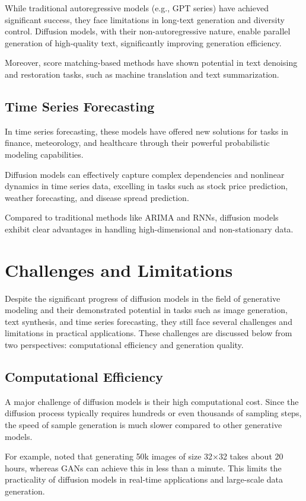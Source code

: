 \documentclass[sigconf,natbib=false]{acmart}
\begin{document}
While traditional autoregressive models (e.g., GPT series) have achieved significant success,
they face limitations in long-text generation and diversity control.
Diffusion models, with their non-autoregressive nature,
enable parallel generation of high-quality text, significantly improving generation efficiency.

Moreover, score matching-based methods have shown potential in text denoising and restoration tasks,
such as machine translation and text summarization.

\subsection{Time Series Forecasting}
In time series forecasting, these models have offered new solutions for tasks in finance,
meteorology, and healthcare through their powerful probabilistic modeling capabilities. \cite{tashiro2021}

Diffusion models can effectively capture complex dependencies
and nonlinear dynamics in time series data,
excelling in tasks such as stock price prediction, weather forecasting,
and disease spread prediction.

Compared to traditional methods like ARIMA and RNNs,
diffusion models exhibit clear advantages in handling high-dimensional and non-stationary data.

\section{Challenges and Limitations}
Despite the significant progress of diffusion models
in the field of generative modeling and their demonstrated potential in tasks
such as image generation, text synthesis, and time series forecasting,
they still face several challenges and limitations in practical applications.
These challenges are discussed below from two perspectives:
computational efficiency and generation quality.

\subsection{Computational Efficiency}
A major challenge of diffusion models is their high computational cost.
Since the diffusion process typically requires hundreds or even thousands of sampling steps,
the speed of sample generation is much slower compared to other generative models.

For example, \cite[Song et al. (2022)]{song2022}
noted that generating 50k images of size 32×32 takes about 20 hours,
whereas GANs can achieve this in less than a minute.
This limits the practicality of diffusion models in real-time applications
and large-scale data generation.
\end{document}
